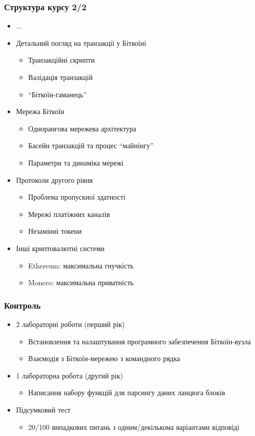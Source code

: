 \documentclass{beamer}
\begin{document}
\begin{frame}
  \frametitle{Структура курсу 2/2}
  \begin{itemize}
  \item[] ...
  \item Детальний погляд на транзакції у Біткоїні
    \begin{itemize}
    \item Транзакційні скрипти
    \item Валідація транзакцій
    \item ``Біткоїн-гаманець''
    \end{itemize}
  \item Мережа Біткоїн
    \begin{itemize}
    \item Однорангова мережева архітектура
    \item Басейн транзакцій та процес ``майнінгу''
    \item Параметри та динаміка мережі
    \end{itemize}
  \item Протоколи другого рівня
    \begin{itemize}
    \item Проблема пропускної здатності
    \item Мережі платіжних каналів
    \item Незамінні токени
    \end{itemize}
  \item Інші криптовалютні системи
    \begin{itemize}
    \item Ethereum: максимальна гнучкість
    \item Monero: максимальна приватність
    \end{itemize}
  \end{itemize}
\end{frame}

\begin{frame}
  \frametitle{Контроль}
  \begin{itemize}
  \item 2 лабораторні роботи (перший рік)
    \begin{itemize}
    \item Встановлення та налаштування програмного забезпечення Біткоїн-вузла
    \item Взаємодія з Біткоїн-мережею з командного рядка
    \end{itemize}
  \item 1 лабораторна робота (другий рік)
    \begin{itemize}
    \item Написання набору функцій для парсингу даних ланцюга блоків
    \end{itemize}
  \item Підсумковий тест
    \begin{itemize}
    \item 20/100 випадкових питань з одним/декількома варіантами відповіді
    \end{itemize}
  \end{itemize}
\end{frame}
\end{document}
